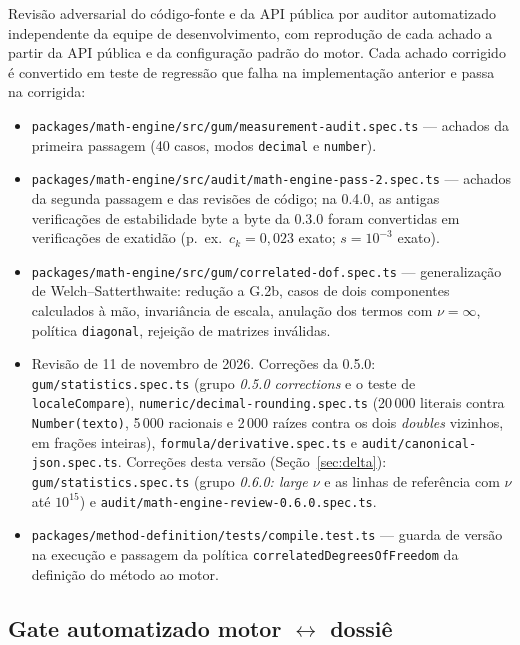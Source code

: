 \documentclass[11pt,a4paper]{article}
\newcommand{\previousVersion}{0.5.0}
\newcommand{\auditedVersion}{0.3.0}
\newcommand{\reviewDate}{11 de novembro de 2026}
\begin{document}
Revisão adversarial do código-fonte e da API pública por auditor automatizado independente da equipe de desenvolvimento, com reprodução de cada achado a partir da API pública e da configuração padrão do motor. Cada achado corrigido é convertido em teste de regressão que falha na implementação anterior e passa na corrigida:

\begin{itemize}
  \item \texttt{packages/math-engine/src/gum/measurement-audit.spec.ts} --- achados da primeira passagem (40 casos, modos \texttt{decimal} e \texttt{number}).
  \item \texttt{packages/math-engine/src/audit/math-engine-pass-2.spec.ts} --- achados da segunda passagem e das revisões de código; na 0.4.0, as antigas verificações de estabilidade byte a byte da \auditedVersion{} foram convertidas em verificações de exatidão (p.~ex.\ \(c_k = 0{,}023\) exato; \(s = 10^{-3}\) exato).
  \item \texttt{packages/math-engine/src/gum/correlated-dof.spec.ts} --- generalização de Welch--Satterthwaite: redução a G.2b, casos de dois componentes calculados à mão, invariância de escala, anulação dos termos com \(\nu = \infty\), política \texttt{diagonal}, rejeição de matrizes inválidas.
  \item Revisão de \reviewDate{}. Correções da \previousVersion{}: \texttt{gum/statistics.spec.ts} (grupo \emph{0.5.0 corrections} e o teste de \texttt{localeCompare}), \texttt{numeric/decimal-rounding.spec.ts} (20\,000 literais contra \texttt{Number(texto)}, 5\,000 racionais e 2\,000 raízes contra os dois \emph{doubles} vizinhos, em frações inteiras), \texttt{formula/derivative.spec.ts} e \texttt{audit/canonical-json.spec.ts}. Correções desta versão (Seção~\ref{sec:delta}): \texttt{gum/statistics.spec.ts} (grupo \emph{0.6.0: large \(\nu\)} e as linhas de referência com \(\nu\) até \(10^{15}\)) e \texttt{audit/math-engine-review-0.6.0.spec.ts}.
  \item \texttt{packages/method-definition/tests/compile.test.ts} --- guarda de versão na execução e passagem da política \texttt{correlatedDegreesOfFreedom} da definição do método ao motor.
\end{itemize}

\subsection{Gate automatizado motor \(\leftrightarrow\) dossiê}
\end{document}

